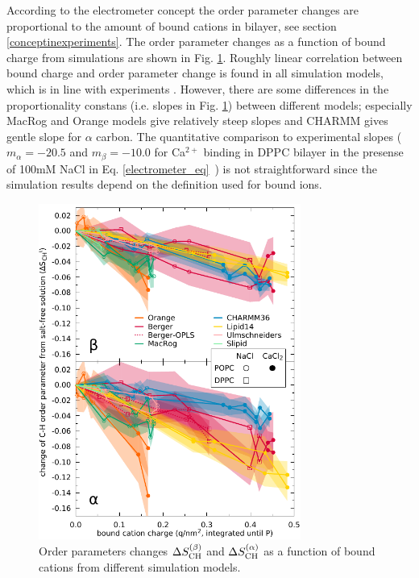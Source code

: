 \documentclass[pre,aps,floatfix,authordate1-4,twocolumn]{revtex4-1}
\begin{document}
According to the electrometer concept the order parameter changes are proportional to
the amount of bound cations in bilayer, see section \ref{conceptinexperiments}.
The order parameter changes as a function of bound charge from simulations are
shown in Fig. \ref{electrometer}. Roughly linear correlation between bound charge
and order parameter change is found in all simulation models, which is in line with
experiments \cite{altenbach84}. However, there are some differences in the 
proportionality constans (i.e. slopes in Fig. \ref{electrometer}) between different
models; especially MacRog and Orange models give relatively steep slopes and CHARMM
gives gentle slope for $\alpha$ carbon. The quantitative comparison to experimental
slopes ( $m_\alpha=-20.5$ and $m_\beta=-10.0$ for Ca$^{2+}$ binding in DPPC bilayer in
the presense of 100mM NaCl in Eq. \ref{electrometer_eq}~\cite{altenbach84}) is not straightforward 
since the simulation results depend on the definition used for bound ions. 
\begin{figure}[]
  \centering
  \includegraphics[width=8.6cm]{../scratch/boundIons/dOP_vs_boundCationCharge_P.pdf}
  \caption{\label{electrometer}
    Order parameters changes $\Delta S_{\rm{CH}}^{(\beta)}$ and $\Delta S_{\rm{CH}}^{(\alpha)}$ as a function of bound
    cations from different simulation models.
   }
\end{figure}
\end{document}
